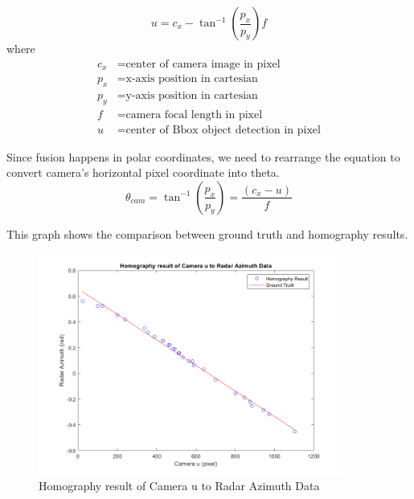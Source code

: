 \begin{equation}\label{equ:img2cart}
u=c_x-\tan^{-1}(\frac{p_x}{p_y})f
\end{equation}
where
\begin{align*}
    c_x &=\text{center of camera image in pixel}\\
    p_x &=\text{x-axis position in cartesian}\\
    p_y &=\text{y-axis position in cartesian}\\
    f &=\text{camera focal length in pixel}\\
    u &=\text{center of Bbox object detection in pixel}
\end{align*}

Since fusion happens in polar coordinates, we need to rearrange the equation to convert camera's horizontal pixel coordinate into theta.
\begin{equation}\label{equ:2_cam_px}
    \theta_{cam}=
    \tan^{-1}(\frac{p_x}{p_y})=
    \frac
    {(c_x-u)}
    {f}
\end{equation}

This graph shows the comparison between ground truth and homography results.

\begin{figure}[hpbt]
    \centering
    \includegraphics[width=10cm]{Figures/matlab/homography_result.png}%
    \caption{Homography result of Camera u to Radar Azimuth Data}
    \label{fig:homography_result}
\end{figure}

